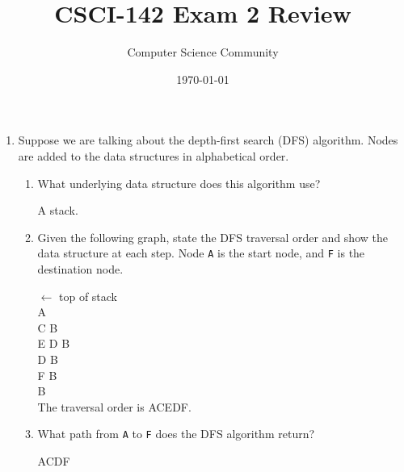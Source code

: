 \documentclass[11pt]{article}
\title{CSCI-142 Exam 2 Review}
\author{Computer Science Community}
\date{\today}
\newenvironment{answer}{\large\lstset{basicstyle=\tiny\ttfamily}\color{white} }{}
\newenvironment{answer}{\large\lstset{basicstyle=\large\ttfamily}\color{red} }{}
\begin{document}
\header
\begin{enumerate}


\item Suppose we are talking about the depth-first search (DFS) algorithm.  Nodes are added to the data structures in alphabetical order.
\begin{enumerate}
\item What underlying data structure does this algorithm use?

\begin{answer}
A stack.
\end{answer}

\item
Given the following graph, state the DFS traversal order and show the data structure at each step.
Node \texttt{A} is the start node, and \texttt{F} is the destination node.

\begin{minipage}{0.35\textwidth}
\vspace{-136pt}
\begin{answer}
$\leftarrow$ top of stack \\
A \\
C B \\
E D B \\
D B \\
F B \\
B \\

The traversal order is ACEDF.
\end{answer}
\end{minipage}

\item
What path from \texttt{A} to \texttt{F} does the DFS algorithm return?

\begin{answer}
ACDF 
\end{answer}


\end{enumerate}
\end{enumerate}
\end{document}

